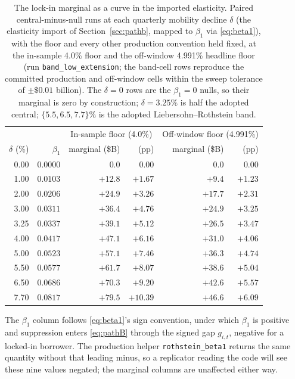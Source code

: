 \documentclass[12pt]{article}
\begin{document}
\begin{table}[!t]
\centering
\caption{The lock-in marginal as a curve in the imported elasticity. Paired central-minus-null runs at each quarterly mobility decline $\delta$ (the elasticity import of Section~\ref{sec:pathb}, mapped to $\beta_1$ via \eqref{eq:beta1}), with the floor and every other production convention held fixed, at the in-sample 4.0\% floor and the off-window 4.991\% headline floor (run \texttt{band\_low\_extension}; the band-cell rows reproduce the committed production and off-window cells within the sweep tolerance of $\pm\$0.01$ billion). The $\delta = 0$ rows are the $\beta_1 = 0$ nulls, so their marginal is zero by construction; $\delta = 3.25\%$ is half the adopted central; $\{5.5, 6.5, 7.7\}\%$ is the adopted Liebersohn--Rothstein band.}
\label{tab:lowband}
\footnotesize
\begin{threeparttable}
\begin{tabular}{@{}rrrrrr@{}}
\toprule
& & \multicolumn{2}{c}{In-sample floor (4.0\%)} & \multicolumn{2}{c}{Off-window floor (4.991\%)} \\
\cmidrule(lr){3-4}\cmidrule(lr){5-6}
$\delta$ (\%) & $\beta_1$ & marginal (\$B) & (pp) & marginal (\$B) & (pp) \\
\midrule
0.00 & $0.0000$ & $0.0$ & $0.00$ & $0.0$ & $0.00$ \\
1.00 & $0.0103$ & $+12.8$ & $+1.67$ & $+9.4$ & $+1.23$ \\
2.00 & $0.0206$ & $+24.9$ & $+3.26$ & $+17.7$ & $+2.31$ \\
3.00 & $0.0311$ & $+36.4$ & $+4.76$ & $+24.9$ & $+3.25$ \\
3.25 & $0.0337$ & $+39.1$ & $+5.12$ & $+26.5$ & $+3.47$ \\
4.00 & $0.0417$ & $+47.1$ & $+6.16$ & $+31.0$ & $+4.06$ \\
5.00 & $0.0523$ & $+57.1$ & $+7.46$ & $+36.3$ & $+4.74$ \\
5.50 & $0.0577$ & $+61.7$ & $+8.07$ & $+38.6$ & $+5.04$ \\
6.50 & $0.0686$ & $+70.3$ & $+9.20$ & $+42.6$ & $+5.57$ \\
7.70 & $0.0817$ & $+79.5$ & $+10.39$ & $+46.6$ & $+6.09$ \\
\bottomrule
\end{tabular}
\begin{tablenotes}[flushleft]\footnotesize
\item The $\beta_1$ column follows \eqref{eq:beta1}'s sign convention, under which $\beta_1$ is positive and suppression enters \eqref{eq:pathB} through the signed gap $g_{i,t}$, negative for a locked-in borrower. The production helper \texttt{rothstein\_beta1} returns the same quantity without that leading minus, so a replicator reading the code will see these nine values negated; the marginal columns are unaffected either way.
\end{tablenotes}
\end{threeparttable}
\end{table}
\end{document}
